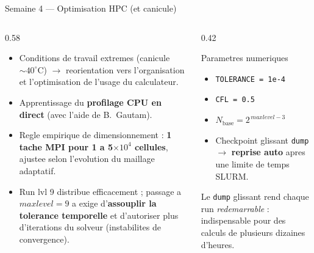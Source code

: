\documentclass[11pt,aspectratio=169]{beamer}
\begin{document}
\begin{frame}{Semaine 4 --- Optimisation HPC (et canicule)}
  \begin{columns}[T]
    \begin{column}{0.58\textwidth}
      \begin{itemize}
        \item Conditions de travail extremes (canicule $\sim 40^\circ$C)
              $\rightarrow$ reorientation vers l'organisation et l'optimisation
              de l'usage du calculateur.
        \item Apprentissage du \textbf{profilage CPU en direct} (avec l'aide de
              B.~Gautam).
        \item Regle empirique de dimensionnement :
              \textbf{1 tache MPI pour 1 a 5$\times 10^4$ cellules}, ajustee selon
              l'evolution du maillage adaptatif.
        \item Run lvl 9 distribue efficacement ; passage a $maxlevel=9$ a exige
              d'\textbf{assouplir la tolerance temporelle} et d'autoriser plus
              d'iterations du solveur (instabilites de convergence).
      \end{itemize}
    \end{column}
    \begin{column}{0.42\textwidth}
      \begin{block}{Parametres numeriques}
        \footnotesize
        \begin{itemize}
          \item \texttt{TOLERANCE = 1e-4}
          \item \texttt{CFL = 0.5}
          \item $N_{\text{base}} = 2^{\,maxlevel-3}$
          \item Checkpoint glissant \texttt{dump} $\to$ \textbf{reprise auto}
                apres une limite de temps SLURM.
        \end{itemize}
      \end{block}
      \footnotesize
      Le \texttt{dump} glissant rend chaque run \emph{redemarrable} : indispensable
      pour des calculs de plusieurs dizaines d'heures.
    \end{column}
  \end{columns}
\end{frame}

\end{document}
